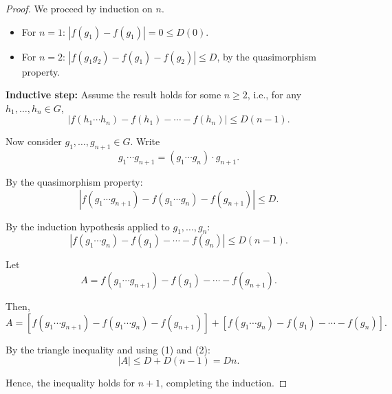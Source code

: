 \documentclass[10pt,a4paper]{amsart}
\begin{document}
\begin{proof}
    We proceed by induction on $n$.
\begin{itemize}
    \item For $ n = 1 $: $ |f(g_1) - f(g_1)| = 0 \leq D(0) $.
    \item For $ n = 2 $: $ |f(g_1g_2) - f(g_1) - f(g_2)| \leq D $, by the quasimorphism property.
\end{itemize}

\textbf{Inductive step:}
Assume the result holds for some $ n \geq 2 $, i.e., for any $ h_1, \ldots, h_n \in G $,
\[
|f(h_1 \cdots h_n) - f(h_1) - \cdots - f(h_n)| \leq D(n - 1). \tag{IH}
\]

Now consider $ g_1, \ldots, g_{n+1} \in G $. Write
\[
g_1 \cdots g_{n+1} = (g_1 \cdots g_n) \cdot g_{n+1}.
\]

By the quasimorphism property:
\[
|f(g_1 \cdots g_{n+1}) - f(g_1 \cdots g_n) - f(g_{n+1})| \leq D. \tag{1}
\]

By the induction hypothesis applied to $ g_1, \ldots, g_n $:
\[
|f(g_1 \cdots g_n) - f(g_1) - \cdots - f(g_n)| \leq D(n - 1). \tag{2}
\]

Let
\[
A = f(g_1 \cdots g_{n+1}) - f(g_1) - \cdots - f(g_{n+1}).
\]

Then,
\[
A = \left[f(g_1 \cdots g_{n+1}) - f(g_1 \cdots g_n) - f(g_{n+1})\right] + \left[f(g_1 \cdots g_n) - f(g_1) - \cdots - f(g_n)\right].
\]

By the triangle inequality and using (1) and (2):
\[
|A| \leq D + D(n - 1) = Dn.
\]

Hence, the inequality holds for $ n+1 $, completing the induction.
\end{proof}
\end{document}
